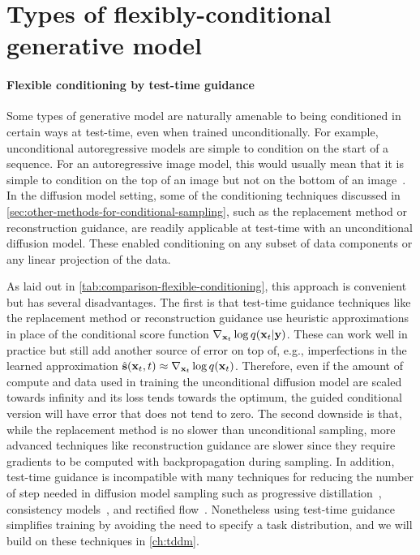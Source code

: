 \section{Types of flexibly-conditional generative model}
\paragraph{Flexible conditioning by test-time guidance}
Some types of generative model are naturally amenable to being conditioned in certain ways at test-time, even when trained unconditionally. For example, unconditional autoregressive models are simple to condition on the start of a sequence. For an autoregressive image model, this would usually mean that it is simple to condition on the top of an image but not on the bottom of an image~\citep{van2016pixel}. In the diffusion model setting, some of the conditioning techniques discussed in \cref{sec:other-methods-for-conditional-sampling}, such as the replacement method or reconstruction guidance, are readily applicable at test-time with an unconditional diffusion model. These enabled conditioning on any subset of data components or any linear projection of the data.

As laid out in \cref{tab:comparison-flexible-conditioning}, this approach is convenient but has several disadvantages. The first is that test-time guidance techniques like the replacement method or reconstruction guidance use heuristic approximations in place of the conditional score function $\nabla_{{\mathbf{x}}_t} \log q({\mathbf{x}}_t|{\mathbf{y}})$. These can work well in practice but still add another source of error on top of, e.g., imperfections in the learned approximation $\hat{{\mathbf{s}}}({\mathbf{x}}_t, t) \approx \nabla_{{\mathbf{x}}_t} \log q({\mathbf{x}}_t)$. Therefore, even if the amount of compute and data used in training the unconditional diffusion model are scaled towards infinity and its loss tends towards the optimum, the guided conditional version will have error that does not tend to zero. The second downside is that, while the replacement method is no slower than unconditional sampling, more advanced techniques like reconstruction guidance are slower since they require gradients to be computed with backpropagation during sampling. In addition, test-time guidance is incompatible with many techniques for reducing the number of step needed in diffusion model sampling such as progressive distillation~\citep{salimans2022progressive}, consistency models~\citep{song2023consistency}, and rectified flow~\citep{esser2024scaling}. Nonetheless using test-time guidance simplifies training by avoiding the need to specify a task distribution, and we will build on these techniques in \cref{ch:tddm}.

